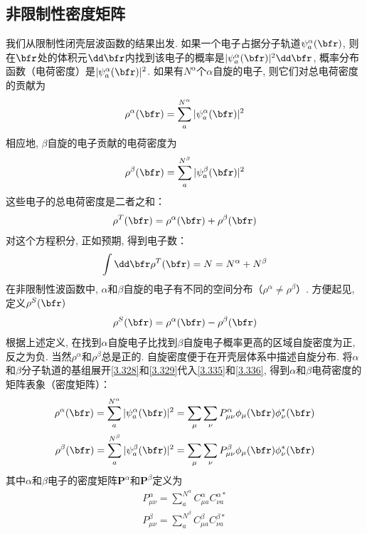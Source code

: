 \subsection{非限制性密度矩阵}
我们从限制性闭壳层波函数的结果出发. 
如果一个电子占据分子轨道$\psi_a^\alpha(\bfr)$, 则在$\bfr$处的体积元$\dd\bfr$内找到该电子的概率是$|\psi^\alpha_a(\bfr)|^2\dd\bfr$, 
概率分布函数（电荷密度）是$|\psi^\alpha_a(\bfr)|^2$. 如果有$N^\alpha$个$\alpha$自旋的电子, 则它们对总电荷密度的贡献为
\begin{align}
	\label{3.335}
	\rho^\alpha(\bfr)=\sum^{N^\alpha}_a|\psi_a^\alpha(\bfr)|^2
\end{align}
相应地, $\beta$自旋的电子贡献的电荷密度为
\begin{align}
	\label{3.336}
	\rho^\beta(\bfr)=\sum^{N^\beta}_a|\psi_a^\beta(\bfr)|^2
\end{align}
这些电子的总电荷密度是二者之和：
\begin{align}
	\rho^T(\bfr)=\rho^\alpha(\bfr)+\rho^\beta(\bfr)
\end{align}
对这个方程积分, 正如预期, 得到电子数：
\begin{align}
	\int{\dd\bfr}\rho^T(\bfr)=N=N^\alpha+N^\beta
\end{align}
在非限制性波函数中, $\alpha$和$\beta$自旋的电子有不同的空间分布（$\rho^\alpha\neq\rho^\beta$）. 
方便起见, 定义$\rho^S(\bfr)$
\begin{align}
	\rho^S(\bfr)=\rho^\alpha(\bfr)-\rho^\beta(\bfr)
\end{align}
根据上述定义, 在找到$\alpha$自旋电子比找到$\beta$自旋电子概率更高的区域自旋密度为正, 反之为负. 
当然$\rho^\alpha$和$\rho^\beta$总是正的.  
自旋密度便于在开壳层体系中描述自旋分布. 
将$\alpha$和$\beta$分子轨道的基组展开\autoref{3.328}和\autoref{3.329}代入\autoref{3.335}和\autoref{3.336}, 得到$\alpha$和$\beta$电荷密度的矩阵表象（密度矩阵）：
\begin{align}
	\rho^\alpha(\bfr)=\sum^{N^\alpha}_a|\psi^\alpha_a(\bfr)|^2=\sum_\mu\sum_\nu P^\alpha_{\mu\nu}\phi_\mu(\bfr)\phi_\nu^*(\bfr) \label{3.340}\\
	\rho^\beta(\bfr)=\sum^{N^\beta}_a|\psi^\beta_a(\bfr)|^2=\sum_\mu\sum_\nu P^\beta_{\mu\nu}\phi_\mu(\bfr)\phi_\nu^*(\bfr)
\end{align}
其中$\alpha$和$\beta$电子的密度矩阵$\mathbf{P}^\alpha$和$\mathbf{P}^\beta$定义为
\begin{align}
	P^\alpha_{\mu\nu}=\sum^{N^\alpha}_aC^\alpha_{\mu a}C^{\alpha*}_{\nu a} \\
	P^\beta_{\mu\nu}=\sum^{N^\beta}_aC^\beta_{\mu a}C^{\beta*}_{\nu a} \label{3.343}
\end{align}
